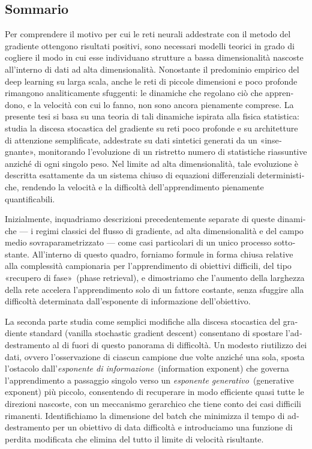 \begin{otherlanguage}{italian}
\chapter*{Sommario}

\begin{noparskip}
Per comprendere il motivo per cui le reti neurali addestrate con il metodo del gradiente ottengono risultati positivi, sono necessari modelli teorici in grado di cogliere il modo in cui esse individuano strutture a bassa dimensionalità nascoste all'interno di dati ad alta dimensionalità. Nonostante il predominio empirico del deep learning su larga scala, anche le reti di piccole dimensioni e poco profonde rimangono analiticamente sfuggenti: le dinamiche che regolano ciò che apprendono, e la velocità con cui lo fanno, non sono ancora pienamente comprese.
La presente tesi si basa su una teoria di tali dinamiche ispirata alla fisica statistica: studia la discesa stocastica del gradiente su reti poco profonde e su architetture di attenzione semplificate, addestrate su dati sintetici generati da un «insegnante», monitorando l'evoluzione di un ristretto numero di statistiche riassuntive anziché di ogni singolo peso.
Nel limite ad alta dimensionalità, tale evoluzione è descritta esattamente da un sistema chiuso di equazioni differenziali deterministiche, rendendo la velocità e la difficoltà dell'apprendimento pienamente quantificabili.

Inizialmente, inquadriamo descrizioni precedentemente separate di queste dinamiche — i regimi classici del flusso di gradiente, ad alta dimensionalità e del campo medio sovraparametrizzato — come casi particolari di un unico processo sottostante. All'interno di questo quadro, forniamo formule in forma chiusa relative alla complessità campionaria per l'apprendimento di obiettivi difficili, del tipo «recupero di fase»~(phase retrieval), e dimostriamo che l'aumento della larghezza della rete accelera l'apprendimento solo di un fattore costante, senza sfuggire alla difficoltà determinata dall'esponente di informazione dell'obiettivo.

La seconda parte studia come semplici modifiche alla discesa stocastica del gradiente standard (vanilla stochastic gradient descent) consentano di spostare l'addestramento al di fuori di questo panorama di difficoltà. Un modesto riutilizzo dei dati, ovvero l'osservazione di ciascun campione due volte anziché una sola, sposta l'ostacolo dall'\emph{esponente di informazione}~(information exponent) che governa l'apprendimento a passaggio singolo verso un \emph{esponente generativo}~(generative exponent) più piccolo, consentendo di recuperare in modo efficiente quasi tutte le direzioni nascoste, con un meccanismo gerarchico che tiene conto dei casi difficili rimanenti. Identifichiamo la dimensione del batch che minimizza il tempo di addestramento per un obiettivo di data difficoltà e introduciamo una funzione di perdita modificata che elimina del tutto il limite di velocità risultante.


\end{noparskip}
\end{otherlanguage}
